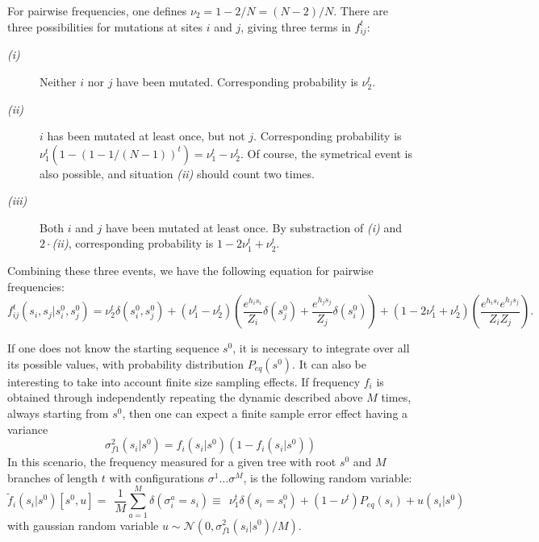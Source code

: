 \documentclass[10pt]{article}
\begin{document}
For pairwise frequencies, one defines $\nu_2 = 1-2/N = (N-2)/N$. There are three possibilities for mutations at sites $i$ and $j$, giving three terms in $f_{ij}^t$: 
\begin{description}
	\item [\emph{(i)}] Neither $i$ nor $j$ have been mutated. Corresponding probability is $\nu_2^t$.
	\item [\emph{(ii)}] $i$ has been mutated at least once, but not $j$. Corresponding probability is $\nu_1^t(1-(1-1/(N-1))^t) = \nu_1^t - \nu_2^t$. Of course, the symetrical event is also possible, and situation \emph{(ii)} should count two times. 
	\item [\emph{(iii)}] Both $i$ and $j$ have been mutated at least once. By substraction of \emph{(i)} and $2\cdot$\emph{(ii)}, corresponding probability is $1-2\nu_1^t+\nu_2^t$.
\end{description}
Combining these three events, we have the following equation for pairwise frequencies:
\begin{equation}
	f_{ij}^t(s_i,s_j\vert s_i^0, s_j^0) = \nu_2^t\delta(s_i^0,s_j^0) + (\nu_1^t - \nu_2^t)\left(\frac{e^{h_is_i}}{Z_i}\delta(s_j^0) + \frac{e^{h_js_j}}{Z_j}\delta(s_i^0)\right) + \left(1 - 2\nu_1^t + \nu_2^t\right)\left(\frac{e^{h_is_i}e^{h_js_j}}{Z_iZ_j}\right).
\end{equation}

If one does not know the starting sequence $s^0$, it is necessary to integrate over all its possible values, with probability distribution $P_{eq}(s^0)$. It can also be interesting to take into account finite size sampling effects. If frequency $f_i$ is obtained through independently repeating the dynamic described above $M$ times, always starting from $s^0$, then one can expect a finite sample error effect having a variance 
$$\sigma_{f1}^2(s_i\vert s^0) = f_i(s_i\vert s^0)\left(1-f_i(s_i\vert s^0)\right)$$
In this scenario, the frequency measured for a given tree with root $s^0$ and $M$ branches of length $t$ with configurations $\sigma^1\ldots\sigma^M$, is the following random variable: 
\begin{equation}
	\tilde{f}_i(s_i\vert s^0)[s^0,u] = \;\,\frac{1}{M}\sum_{a=1}^M\delta(\sigma_i^a=s_i) \equiv \;\, \nu_1^t\delta(s_i=s^0_i) + (1-\nu^t)P_{eq}(s_i) + u(s_i\vert s^0)
\end{equation}
with gaussian random variable $u\sim\mathcal{N}\left(0,\sigma^2_{f1}(s_i\vert s^0)/M\right)$.


\end{document}
